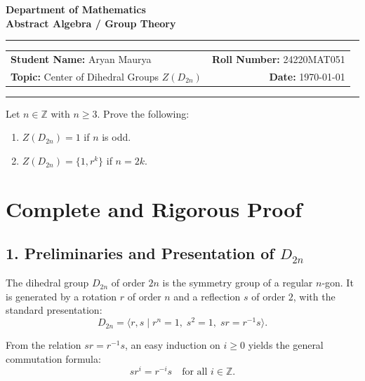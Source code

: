 \documentclass[11pt,a4paper]{article}
\begin{document}
\begin{center}
    {\LARGE \textbf{Department of Mathematics}}\\[3pt]
    {\large \textbf{Abstract Algebra / Group Theory}}\\[6pt]
    \rule{\textwidth}{0.8pt}
    \vspace{2pt}
    \begin{tabular*}{\textwidth}{l @{\extracolsep{\fill}} r}
        \textbf{Student Name:} Aryan Maurya & \textbf{Roll Number:} 24220MAT051 \\
        \textbf{Topic:} Center of Dihedral Groups $Z(D_{2n})$ & \textbf{Date:} \today
    \end{tabular*}
    \vspace{-4pt}
    \rule{\textwidth}{0.8pt}
\end{center}

\vspace{4pt}

\begin{tcolorbox}[title={Problem Statement (Chapter 2, Problem 7)}]
Let $n \in \mathbb{Z}$ with $n \ge 3$. Prove the following:
\begin{enumerate}
    \item[\textbf{(a)}] $Z(D_{2n}) = 1$ if $n$ is odd.
    \item[\textbf{(b)}] $Z(D_{2n}) = \{1, r^k\}$ if $n = 2k$.
\end{enumerate}
\end{tcolorbox}

\vspace{4pt}

\section*{Complete and Rigorous Proof}

\subsection*{1. Preliminaries and Presentation of $D_{2n}$}
The dihedral group $D_{2n}$ of order $2n$ is the symmetry group of a regular $n$-gon. It is generated by a rotation $r$ of order $n$ and a reflection $s$ of order $2$, with the standard presentation:
\[
D_{2n} = \big\langle r, s \;\big|\; r^n = 1,\; s^2 = 1,\; sr = r^{-1}s \big\rangle.
\]

From the relation $sr = r^{-1}s$, an easy induction on $i \ge 0$ yields the general commutation formula:
\begin{equation} \label{eq:rel}
s r^i = r^{-i} s \quad \text{for all } i \in \mathbb{Z}.
\end{equation}
\end{document}
